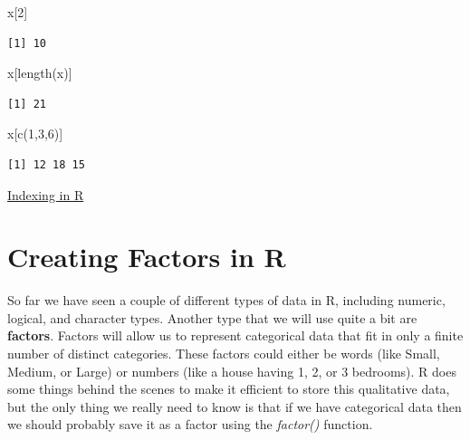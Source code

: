 \documentclass[
  letterpaper,
  DIV=11,
  numbers=noendperiod]{scrreprt}
\newenvironment{Shaded}{\begin{snugshade}}{\end{snugshade}}
\newcommand{\DecValTok}[1]{\textcolor[rgb]{0.68,0.00,0.00}{#1}}
\newcommand{\FunctionTok}[1]{\textcolor[rgb]{0.28,0.35,0.67}{#1}}
\newcommand{\NormalTok}[1]{\textcolor[rgb]{0.00,0.23,0.31}{#1}}
\begin{document}
\begin{Shaded}
\begin{Highlighting}[]
\NormalTok{x[}\DecValTok{2}\NormalTok{]}
\end{Highlighting}
\end{Shaded}

\begin{verbatim}
[1] 10
\end{verbatim}

\begin{Shaded}
\begin{Highlighting}[]
\NormalTok{x[}\FunctionTok{length}\NormalTok{(x)]}
\end{Highlighting}
\end{Shaded}

\begin{verbatim}
[1] 21
\end{verbatim}

\begin{Shaded}
\begin{Highlighting}[]
\NormalTok{x[}\FunctionTok{c}\NormalTok{(}\DecValTok{1}\NormalTok{,}\DecValTok{3}\NormalTok{,}\DecValTok{6}\NormalTok{)]}
\end{Highlighting}
\end{Shaded}

\begin{verbatim}
[1] 12 18 15
\end{verbatim}

\begin{watch}{}{}
    \href{https://youtu.be/isTXaMdsyfI}{Indexing in R}
\end{watch}

\section{Creating Factors in R}\label{creating-factors-in-r}

So far we have seen a couple of different types of data in R, including
numeric, logical, and character types. Another type that we will use
quite a bit are \textbf{factors}. Factors will allow us to represent
categorical data that fit in only a finite number of distinct
categories. These factors could either be words (like Small, Medium, or
Large) or numbers (like a house having 1, 2, or 3 bedrooms). R does some
things behind the scenes to make it efficient to store this qualitative
data, but the only thing we really need to know is that if we have
categorical data then we should probably save it as a factor using the
\emph{factor()} function.
\end{document}
